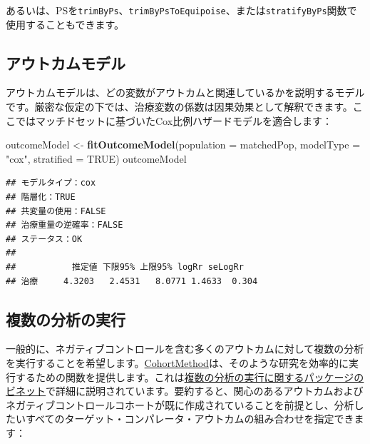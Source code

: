 \documentclass[
  11pt]{book}
\newenvironment{Shaded}{\begin{snugshade}}{\end{snugshade}}
\newcommand{\AttributeTok}[1]{\textcolor[rgb]{0.13,0.29,0.53}{#1}}
\newcommand{\ConstantTok}[1]{\textcolor[rgb]{0.56,0.35,0.01}{#1}}
\newcommand{\FunctionTok}[1]{\textcolor[rgb]{0.13,0.29,0.53}{\textbf{#1}}}
\newcommand{\NormalTok}[1]{#1}
\newcommand{\OtherTok}[1]{\textcolor[rgb]{0.56,0.35,0.01}{#1}}
\newcommand{\StringTok}[1]{\textcolor[rgb]{0.31,0.60,0.02}{#1}}
\theoremstyle{definition}
\theoremstyle{definition}
\theoremstyle{definition}
\theoremstyle{definition}
\theoremstyle{remark}
\begin{document}
あるいは、PSを\texttt{trimByPs}、\texttt{trimByPsToEquipoise}、または\texttt{stratifyByPs}関数で使用することもできます。

\subsection{アウトカムモデル}\label{ux30a2ux30a6ux30c8ux30abux30e0ux30e2ux30c7ux30eb}

アウトカムモデルは、どの変数がアウトカムと関連しているかを説明するモデルです。厳密な仮定の下では、治療変数の係数は因果効果として解釈できます。ここではマッチドセットに基づいたCox比例ハザードモデルを適合します：

\begin{Shaded}
\begin{Highlighting}[]
\NormalTok{outcomeModel }\OtherTok{\textless{}{-}} \FunctionTok{fitOutcomeModel}\NormalTok{(}\AttributeTok{population =}\NormalTok{ matchedPop,}
                                \AttributeTok{modelType =} \StringTok{"cox"}\NormalTok{,}
                                \AttributeTok{stratified =} \ConstantTok{TRUE}\NormalTok{)}
\NormalTok{outcomeModel}
\end{Highlighting}
\end{Shaded}

\begin{verbatim}
## モデルタイプ：cox
## 階層化：TRUE
## 共変量の使用：FALSE
## 治療重量の逆確率：FALSE
## ステータス：OK
## 
##           推定値 下限95% 上限95% logRr seLogRr
## 治療     4.3203   2.4531   8.0771 1.4633  0.304
\end{verbatim}

\subsection{複数の分析の実行}\label{MultipleAnalyses}

一般的に、ネガティブコントロールを含む多くのアウトカムに対して複数の分析を実行することを希望します。\href{https://ohdsi.github.io/CohortMethod/}{CohortMethod}は、そのような研究を効率的に実行するための関数を提供します。これは\href{https://ohdsi.github.io/CohortMethod/articles/MultipleAnalyses.html}{複数の分析の実行に関するパッケージのビネット}で詳細に説明されています。要約すると、関心のあるアウトカムおよびネガティブコントロールコホートが既に作成されていることを前提とし、分析したいすべてのターゲット・コンパレータ・アウトカムの組み合わせを指定できます：
\end{document}
